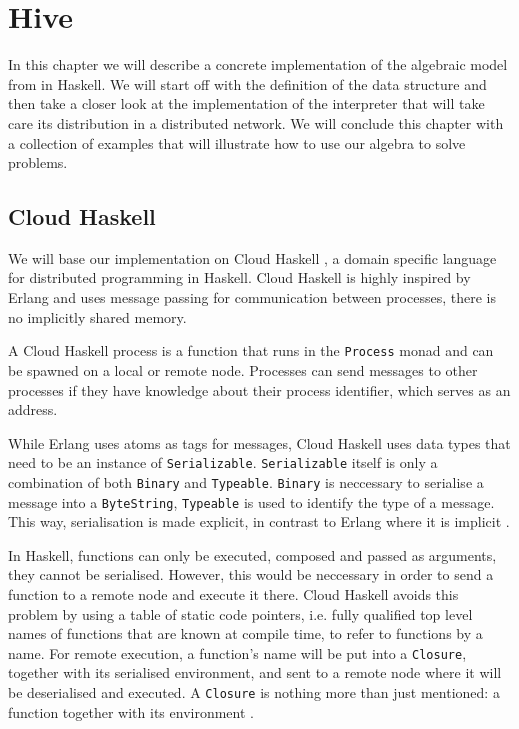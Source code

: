 \chapter{Hive}
In this chapter we will describe a concrete implementation of the algebraic model from  in Haskell. We will start off with the definition of the data structure and then take a closer look at the implementation of the interpreter that will take care its distribution in a distributed network. We will conclude this chapter with a collection of examples that will illustrate how to use our algebra to solve problems.

\section{Cloud Haskell}
We will base our implementation on Cloud Haskell \cite{Epstein:2011:THC:2034675.2034690}, a domain specific language for distributed programming in Haskell. Cloud Haskell is highly inspired by Erlang and uses message passing for communication between processes, there is no implicitly shared memory.

A Cloud Haskell process is a function that runs in the \texttt{Process} monad and can be spawned on a local or remote node. Processes can send messages to other processes if they have knowledge about their process identifier, which serves as an address.

While Erlang uses atoms as tags for messages, Cloud Haskell uses data types that need to be an instance of \texttt{Serializable}. \texttt{Serializable} itself is only a combination of both \texttt{Binary} and \texttt{Typeable}. \texttt{Binary} is neccessary to serialise a message into a \texttt{ByteString}, \texttt{Typeable} is used to identify the type of a message. This way, serialisation is made explicit, in contrast to Erlang where it is implicit \cite{Epstein:2011:THC:2034675.2034690}.

In Haskell, functions can only be executed, composed and passed as arguments, they cannot be serialised. However, this would be neccessary in order to send a function to a remote node and execute it there. Cloud Haskell avoids this problem by using a table of static code pointers, i.e. fully qualified top level names of functions that are known at compile time, to refer to functions by a name. For remote execution, a function's name will be put into a \texttt{Closure}, together with its serialised environment, and sent to a remote node where it will be deserialised and executed. A \texttt{Closure} is nothing more than just mentioned: a function together with its environment \cite{Epstein:2011:THC:2034675.2034690}.

